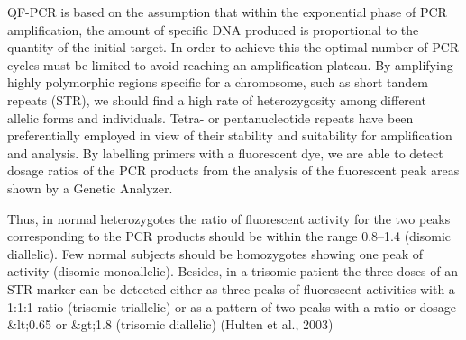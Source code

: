 QF-PCR is based on the assumption that within the exponential phase of PCR amplification, the
amount of specific DNA produced is proportional to the quantity of the initial target. In order to achieve this the optimal number of PCR cycles must be limited to avoid reaching an amplification plateau. By amplifying highly polymorphic regions specific for a chromosome, such as short tandem repeats (STR), we should find a high rate of heterozygosity among different allelic forms and individuals. Tetra- or pentanucleotide repeats have been preferentially employed in view of their stability and suitability for amplification and analysis. By labelling primers with a fluorescent dye, we are able to detect dosage ratios of the PCR products from the analysis of the fluorescent peak areas shown by a Genetic Analyzer.


Thus, in normal heterozygotes the ratio of fluorescent activity for the two peaks  corresponding to the PCR products should be within the range 0.8–1.4 (disomic diallelic). Few normal subjects should be homozygotes showing one peak of activity (disomic monoallelic). Besides, in a trisomic patient the three doses of an STR marker can be detected either as three peaks of fluorescent activities with a 1:1:1 ratio (trisomic triallelic) or as a
pattern of two peaks with a ratio or dosage &lt;0.65 or &gt;1.8 (trisomic diallelic) (Hulten et al., 2003)

